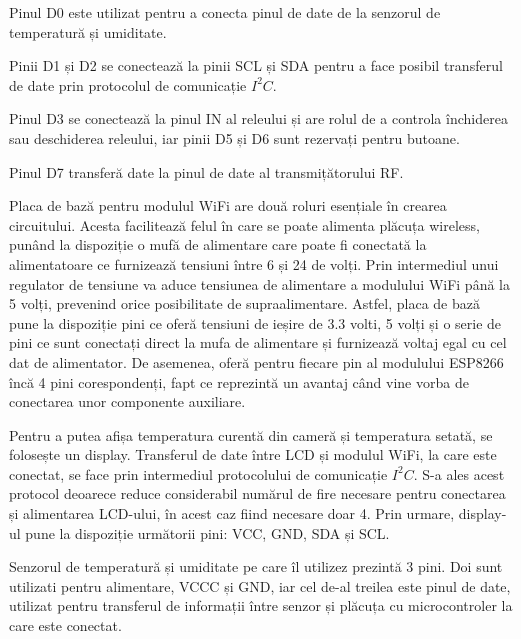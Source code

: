 	Pinul D0 este utilizat pentru a conecta pinul de date de la senzorul de temperatură și umiditate.

	Pinii D1 și D2 se conectează la pinii SCL și SDA pentru a face posibil transferul de date prin protocolul de comunicație $I^2C$.

	Pinul D3 se conectează la pinul IN al releului și are rolul de a controla închiderea sau deschiderea releului, iar pinii D5 și D6 sunt rezervați pentru butoane. 

	Pinul D7 transferă date la pinul de date al transmițătorului RF. 

\vspace{1em}

	Placa de bază pentru modulul WiFi are două roluri esențiale în crearea circuitului. Acesta facilitează felul în care se poate alimenta plăcuța wireless, punând la dispoziție o mufă de alimentare care poate fi conectată la alimentatoare ce furnizează tensiuni între 6 și 24 de volți. Prin intermediul unui regulator de tensiune va aduce tensiunea de alimentare a modulului WiFi până la 5 volți, prevenind orice posibilitate de supraalimentare. Astfel, placa de bază pune la dispoziție pini ce oferă tensiuni de ieșire de 3.3 volti, 5 volți și o serie de pini ce sunt conectați direct la mufa de alimentare și furnizează voltaj egal cu cel dat de alimentator. De asemenea, oferă pentru fiecare pin al modulului ESP8266 încă 4 pini corespondenți, fapt ce reprezintă un avantaj când vine vorba de conectarea unor componente auxiliare.

\vspace{1em}

	Pentru a putea afișa temperatura curentă din cameră și temperatura setată, se folosește un display. Transferul de date între LCD și modulul WiFi, la care este conectat, se face prin intermediul protocolului de comunicație $I^2C$. S-a ales acest protocol deoarece reduce considerabil numărul de fire necesare pentru conectarea și alimentarea LCD-ului, în acest caz fiind necesare doar 4. Prin urmare, display-ul pune la dispoziție următorii pini:  VCC, GND, SDA și SCL.

\vspace{1em}

	Senzorul de temperatură și umiditate pe care îl utilizez prezintă 3 pini. Doi sunt utilizati pentru alimentare, VCCC și GND, iar cel de-al treilea este pinul de date, utilizat pentru transferul de informații între senzor și plăcuța cu microcontroler la care este conectat.

